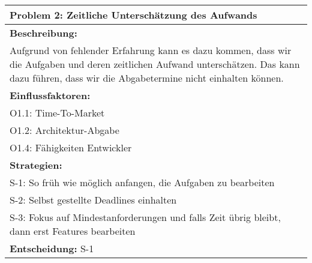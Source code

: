 \documentclass[fontsize=12pt,paper=a4,twoside]{scrartcl}
\begin{document}
\begin{longtable}{|p{15cm}|}
\hline
Problem 2: Zeitliche Unterschätzung des Aufwands                                                                           
\\ \hline                                                                                                                                                                                                                                                                                                                                                                                                                                                                                                                                                        
\textbf{Beschreibung:} \\
Aufgrund von fehlender Erfahrung kann es dazu kommen, dass wir die Aufgaben und deren zeitlichen Aufwand unterschätzen.
Das kann dazu führen, dass wir die Abgabetermine nicht einhalten können.
\\ \hline
\textbf{Einflussfaktoren:} \\
O1.1: Time-To-Market \\
O1.2: Architektur-Abgabe \\
O1.4: Fähigkeiten Entwickler
\\ \hline
\textbf{Strategien:} \\
S-1: So früh wie möglich anfangen, die Aufgaben zu bearbeiten \\
S-2: Selbst gestellte Deadlines einhalten \\
S-3: Fokus auf Mindestanforderungen und falls Zeit übrig bleibt, dann erst Features bearbeiten
 \\ \hline
 \textbf{Entscheidung:} S-1
\\ \hline
\end{longtable}
\newpage
\end{document}
